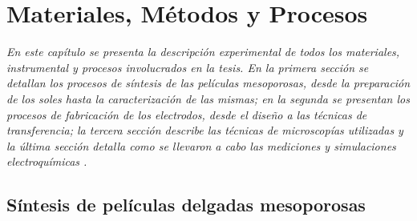  \newcommand{\NoBiblioMat}[1]{
 \ifthenelse{\equal{#1}{verdadero}}{}{}
 \NoBiblioMat{verdadero}}


 \FormatoCapituloUnaLinea

 \chapter{Materiales, Métodos y Procesos}\label{chap:Materiales}

 \thispagestyle{empty}
	
  \noindent\textit{En este capítulo se presenta la descripción experimental de todos los materiales, instrumental y procesos involucrados en la tesis. En la primera sección se detallan los procesos de síntesis de las películas mesoporosas, desde la preparación de los soles hasta la caracterización de las mismas; en la segunda se presentan los procesos de fabricación de los electrodos, desde el diseño a las técnicas de transferencia; la tercera sección describe las técnicas de microscopías utilizadas y la última sección detalla como se llevaron a cabo las mediciones y simulaciones electroquímicas .}


 \vfill
 \minitoc
 \newpage


\section{Síntesis de películas delgadas mesoporosas}\label{sec:sintesis_mesoporosos}	
	
